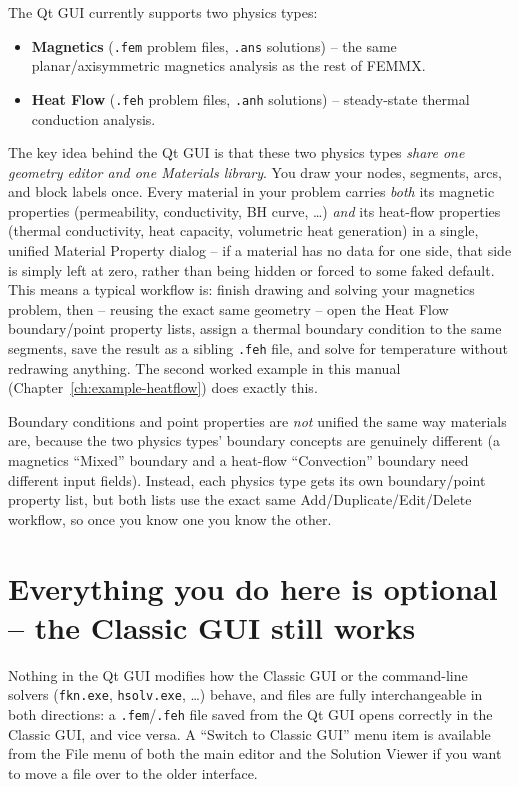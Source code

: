 \documentclass[11pt]{report}
\begin{document}
The Qt GUI currently supports two physics types:

\begin{itemize}
  \item \textbf{Magnetics} (\texttt{.fem} problem files, \texttt{.ans}
    solutions) -- the same planar/axisymmetric magnetics analysis as
    the rest of FEMMX.
  \item \textbf{Heat Flow} (\texttt{.feh} problem files, \texttt{.anh}
    solutions) -- steady-state thermal conduction analysis.
\end{itemize}

The key idea behind the Qt GUI is that these two physics types
\emph{share one geometry editor and one Materials library}. You draw
your nodes, segments, arcs, and block labels once. Every material in
your problem carries \emph{both} its magnetic properties (permeability,
conductivity, BH curve, \ldots) \emph{and} its heat-flow properties
(thermal conductivity, heat capacity, volumetric heat generation) in a
single, unified Material Property dialog -- if a material has no data
for one side, that side is simply left at zero, rather than being
hidden or forced to some faked default. This means a typical workflow
is: finish drawing and solving your magnetics problem, then -- reusing
the exact same geometry -- open the Heat Flow boundary/point property
lists, assign a thermal boundary condition to the same segments, save
the result as a sibling \texttt{.feh} file, and solve for temperature
without redrawing anything. The second worked example in this manual
(Chapter~\ref{ch:example-heatflow}) does exactly this.

Boundary conditions and point properties are \emph{not} unified the
same way materials are, because the two physics types' boundary
concepts are genuinely different (a magnetics ``Mixed'' boundary and a
heat-flow ``Convection'' boundary need different input fields). Instead,
each physics type gets its own boundary/point property list, but both
lists use the exact same Add/Duplicate/Edit/Delete workflow, so once you
know one you know the other.

\section{Everything you do here is optional -- the Classic GUI still works}

Nothing in the Qt GUI modifies how the Classic GUI or the command-line
solvers (\texttt{fkn.exe}, \texttt{hsolv.exe}, \ldots) behave, and files
are fully interchangeable in both directions: a \texttt{.fem}/\texttt{.feh}
file saved from the Qt GUI opens correctly in the Classic GUI, and vice
versa. A ``Switch to Classic GUI'' menu item is available from the File
menu of both the main editor and the Solution Viewer if you want to move
a file over to the older interface.
\end{document}
